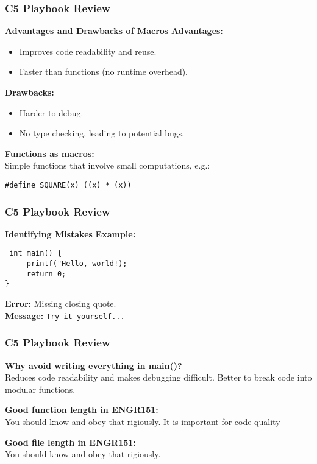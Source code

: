 \documentclass[
	11pt, %
]{beamer}
\begin{document}
	\begin{frame}
	\frametitle{C5 Playbook Review}
	\textbf{ Advantages and Drawbacks of Macros}
	\textbf{Advantages:}
	\begin{itemize}
		\item Improves code readability and reuse.
		\item Faster than functions (no runtime overhead).
	\end{itemize}
	
	\textbf{Drawbacks:}
	\begin{itemize}
		\item Harder to debug.
		\item No type checking, leading to potential bugs.
	\end{itemize}
	
	\textbf{Functions as macros:} \\
	Simple functions that involve small computations, e.g.:
	\begin{center}
	\texttt{\#define SQUARE(x) ((x) * (x))}
	\end{center}
	\end{frame}
	
	\begin{frame}
		\frametitle{C5 Playbook Review}
		\textbf{Identifying Mistakes}
	\textbf{Example:}

	\texttt{
	int main() \{ \\
	~~~~ printf("Hello, world!); \\
	~~~~ return 0; \\
	\}
	}

	\textbf{Error:} Missing closing quote. \\
	\textbf{Message:} \texttt{Try it yourself...}
	\end{frame}
	
	\begin{frame}
		\frametitle{C5 Playbook Review}
	\textbf{Why avoid writing everything in main()?} \\
	Reduces code readability and makes debugging difficult. Better to break code into modular functions.
	
	\textbf{Good function length in ENGR151:} \\
	
	You should know and obey that rigiously. It is important for code quality
	
	\textbf{Good file length in ENGR151:} \\
	You should know and obey that rigiously.
	
	\end{frame}
	
\end{document}
